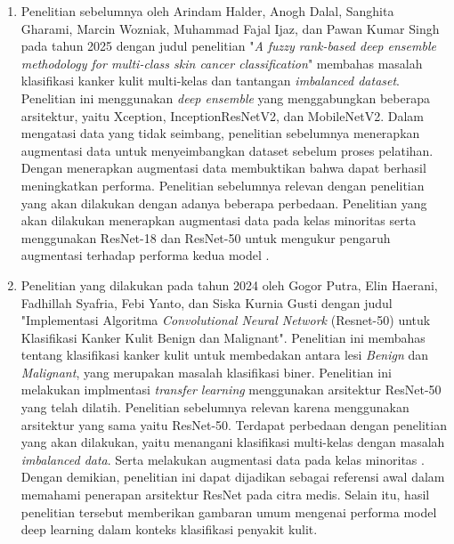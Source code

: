 \begin{enumerate}[noitemsep]
	\item Penelitian sebelumnya oleh Arindam Halder, Anogh Dalal, 
	Sanghita Gharami, Marcin Wozniak, Muhammad Fajal Ijaz, dan Pawan 
	Kumar Singh pada tahun 2025 dengan judul penelitian "\textit{A fuzzy 
	rank-based deep ensemble methodology for multi-class skin cancer 
	classification}" membahas masalah klasifikasi kanker kulit multi-kelas 
	dan tantangan \textit{imbalanced dataset}. Penelitian ini menggunakan 
	\textit{deep ensemble} yang menggabungkan beberapa arsitektur, yaitu 
	Xception, InceptionResNetV2, dan MobileNetV2. Dalam mengatasi data 
	yang tidak seimbang, penelitian sebelumnya menerapkan augmentasi data 
	untuk menyeimbangkan dataset sebelum proses pelatihan. Dengan 
	menerapkan augmentasi data membuktikan bahwa dapat berhasil 
	meningkatkan performa. Penelitian sebelumnya relevan dengan penelitian 
	yang akan dilakukan dengan adanya beberapa perbedaan. Penelitian yang 
	akan dilakukan menerapkan augmentasi data pada kelas minoritas serta 
	menggunakan ResNet-18 dan ResNet-50 untuk mengukur pengaruh augmentasi 
	terhadap performa kedua model \cite{halder2025fuzzy}.

	\item Penelitian yang dilakukan pada tahun 2024 oleh Gogor Putra, 
	Elin Haerani, Fadhillah Syafria, Febi Yanto, dan Siska Kurnia Gusti 
	dengan judul "Implementasi Algoritma \textit{Convolutional Neural 
	Network} (Resnet-50) untuk Klasifikasi Kanker Kulit Benign dan 
	Malignant". Penelitian ini membahas tentang klasifikasi kanker kulit 
	untuk membedakan antara lesi \textit{Benign} dan \textit{Malignant}, 
	yang merupakan masalah klasifikasi biner. Penelitian ini melakukan 
	implmentasi \textit{transfer learning} menggunakan arsitektur 
	ResNet-50 yang telah dilatih. Penelitian sebelumnya relevan karena 
	menggunakan arsitektur yang sama yaitu ResNet-50. Terdapat perbedaan 
	dengan penelitian yang akan dilakukan, yaitu menangani klasifikasi 
	multi-kelas dengan masalah \textit{imbalanced data}. Serta melakukan 
	augmentasi data pada kelas minoritas \cite{Gusti_Haerani_Syafria_Yanto_Gusti_2024}. 
	Dengan demikian, penelitian ini dapat dijadikan sebagai referensi awal 
	dalam memahami penerapan arsitektur ResNet pada citra medis. Selain 
	itu, hasil penelitian tersebut memberikan gambaran umum mengenai 
	performa model deep learning dalam konteks klasifikasi penyakit kulit.


\end{enumerate}
